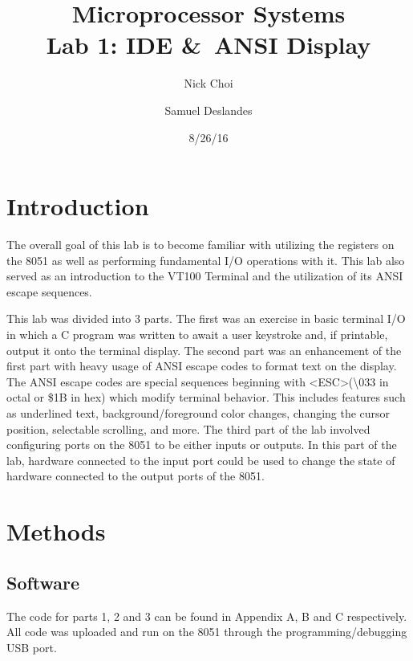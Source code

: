 \documentclass[12pt]{article}
\begin{document}
\title{Microprocessor Systems\\ Lab 1: IDE \&\ ANSI Display}
\author{Nick Choi \and Samuel Deslandes}
\date{8/26/16}
\maketitle
\pagebreak
\section{Introduction}
The overall goal of this lab is to become familiar with utilizing the registers on the 8051 as well as performing fundamental I/O operations with it. This lab also served as an introduction to the VT100 Terminal and the utilization of its ANSI escape sequences.

This lab was divided into 3 parts. The first was an exercise in basic terminal I/O in which a C program was written to await a user keystroke and, if printable, output it onto the terminal display. The second part was an enhancement of the first part with heavy usage of ANSI escape codes to format text on the display. The ANSI escape codes are special sequences beginning with \textless ESC\textgreater (\textbackslash033 in octal or \$1B in hex) which modify terminal behavior. This includes features such as underlined text, background/foreground color changes, changing the cursor position, selectable scrolling, and more. The third part of the lab involved configuring ports on the 8051 to be either inputs or outputs. In this part of the lab, hardware connected to the input port could be used to change the state of hardware connected to the output ports of the 8051. 

\section{Methods}
\subsection{Software}
The code for parts 1, 2 and 3 can be found in Appendix A, B and C respectively. All code was uploaded and run on the 8051 through the programming/debugging USB port. 	
\end{document}
